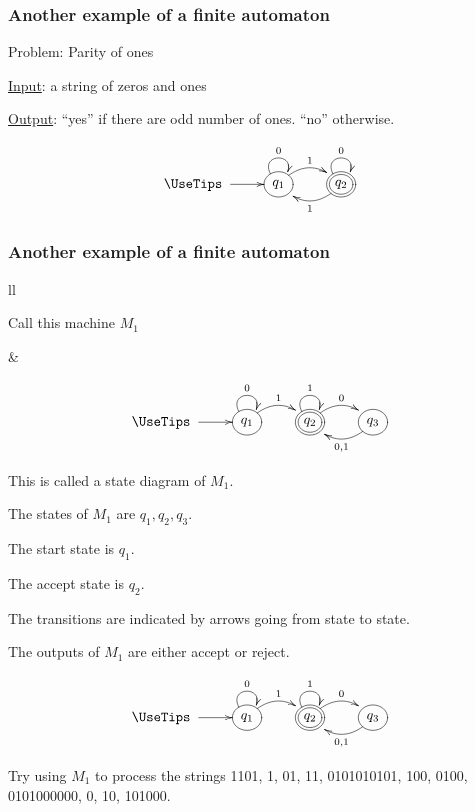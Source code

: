 \documentclass[xcolor=table]{beamer}
\begin{document}
\begin{frame}
  \frametitle{Another example of a finite automaton}

  \begin{block}{Problem: Parity of ones}

  \hspace{14pt}\underline{Input}: a string of zeros and ones

  \hspace{14pt}\underline{Output}: ``yes'' if there are odd number of ones. ``no'' otherwise.
  \end{block}

  \[\UseTips
  \xymatrix {
      *+\txt{\ } \ar[r] & *++[o][F]{q_1} \ar@(ul,ur)^{0}
  \ar@/^1pc/[r]^{1} & *++[o][F=]{q_2} \ar@(ul,ur)^{0}   \ar@/^1pc/[l]^{1}
  }
  \]
  
\end{frame}


\begin{frame}
  \frametitle{Another example of a finite automaton}

  \begin{tabular}{ll}
    \begin{minipage}{1.3in}
  Call this machine $M_1$ 
  \end{minipage}
    &
  \begin{minipage}{3in}
  \[\UseTips
  \xymatrix {
      *+\txt{\ } \ar[r] & *++[o][F]{q_1} \ar@(ul,ur)^{0}
  \ar@/^1pc/[r]^{1} & *++[o][F=]{q_2} \ar@(ul,ur)^{1}
  \ar@/^1pc/[r]^{0} & *++[o][F]{q_3} \ar@/^1pc/[l]^{0,1}
  }
  \]
  \end{minipage}
  \end{tabular}

  This is called a \alert{state diagram} of $M_1$.

  The \alert{states} of $M_1$ are $q_1, q_2, q_3$.
  
  The \alert{start state} is $q_1$.

  The \alert{accept state} is $q_2$.
  
  The \alert{transitions} are indicated by arrows going from
  state to state.

  The \alert{outputs} of $M_1$ are either \alert{accept} or \alert{reject}.

\end{frame}


\begin{frame}

  \[\UseTips
  \xymatrix {
      *+\txt{\ } \ar[r] & *++[o][F]{q_1} \ar@(ul,ur)^{0}
  \ar@/^1pc/[r]^{1} & *++[o][F=]{q_2} \ar@(ul,ur)^{1}
  \ar@/^1pc/[r]^{0} & *++[o][F]{q_3} \ar@/^1pc/[l]^{0,1}
  }
  \]

  Try using $M_1$ to process the strings 1101, 1, 01, 11, 0101010101,
  100, 0100, 0101000000, 0, 10, 101000.


\end{frame}
\end{document}
